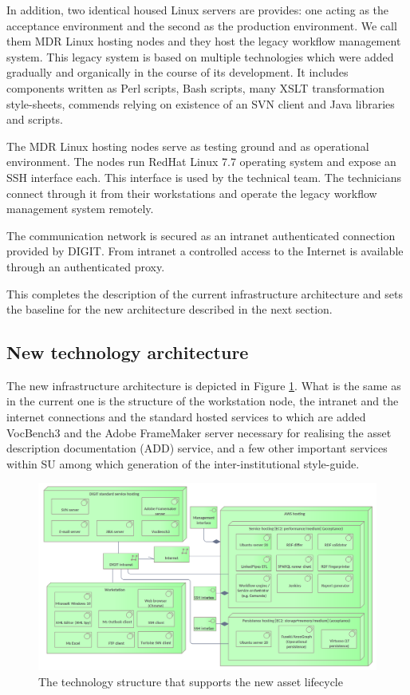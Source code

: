 	In addition, two identical housed Linux servers are provides: one acting as the acceptance environment and the second as the production environment. We call them MDR Linux hosting nodes and they host the legacy workflow management system. This legacy system is based on multiple technologies which were added gradually and organically in the course of its development. It includes components written as Perl scripts, Bash scripts, many XSLT transformation style-sheets, commends relying on existence of an SVN client and Java libraries and scripts.
		
	The MDR Linux hosting nodes serve as testing ground and as operational environment. The nodes run RedHat Linux 7.7 operating system and expose an SSH interface each. This interface is used by the technical team. The technicians connect through it from their workstations and operate the legacy workflow management system remotely.
	
	The communication network is secured as an intranet authenticated connection provided by DIGIT. From intranet a controlled access to the Internet is available through an authenticated proxy. 
	
	This completes the description of the current infrastructure architecture and sets the baseline for the new architecture described in the next section.
	
	\subsection{New technology architecture}
	\label{sec:technology-new}
	
	The new infrastructure architecture is depicted in Figure \ref{fig:technology-new}. What is the same as in the current one is the structure of the workstation node, the intranet and the internet connections and the standard hosted services to which are added VocBench3 and the Adobe FrameMaker server necessary for realising the asset description documentation (ADD) service, and a few other important services within SU among which generation of the inter-institutional style-guide. 
	
	\begin{figure}[!h]
		\centering
		\includegraphics[width=1.01\textwidth]{images/technology/New Platform.png}
		\caption{The technology structure that supports the new asset lifecycle}
		\label{fig:technology-new}
	\end{figure}

